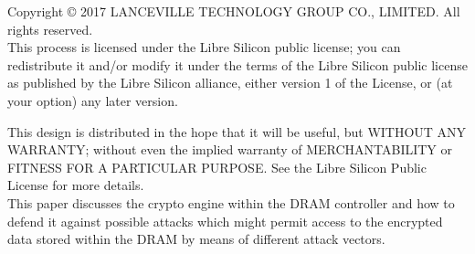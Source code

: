 Copyright © 2017 LANCEVILLE TECHNOLOGY GROUP CO., LIMITED. All rights reserved. \\

This process is licensed under the Libre Silicon public license; you can redistribute it and/or modify it under the terms of the Libre Silicon public license
as published by the Libre Silicon alliance, either version 1 of the License, or (at your option) any later version.

This design is distributed in the hope that it will be useful, but WITHOUT ANY WARRANTY; without even the implied warranty of MERCHANTABILITY or FITNESS FOR A PARTICULAR PURPOSE.
See the Libre Silicon Public License for more details. \\

This paper discusses the crypto engine within the DRAM controller and how to defend it against possible attacks which might permit access to the encrypted data stored within the DRAM by means of different attack vectors.